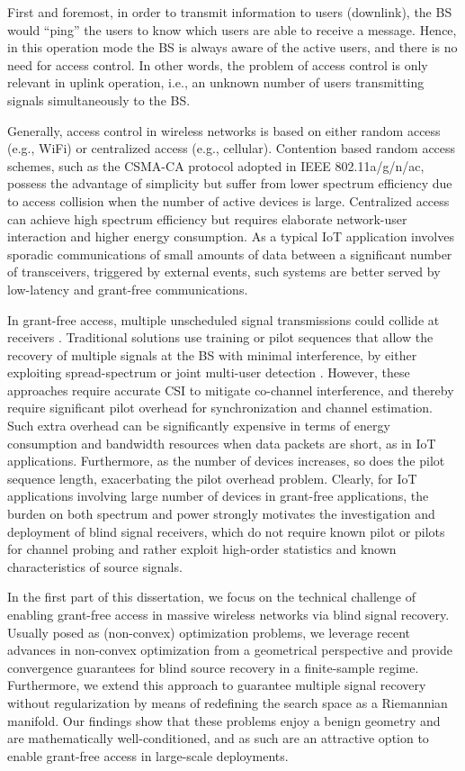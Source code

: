 First and foremost, in order to transmit information to users (downlink), the BS would ``ping'' the users to know which users are able to receive a message. Hence, in this operation mode the BS is always aware of the active users, and there is no need for access control. In other words, the problem of access control is only relevant in uplink operation, i.e., an unknown number of users transmitting signals simultaneously to the BS. 

Generally, access control in wireless networks is based on either random access (e.g., WiFi) or centralized access (e.g., cellular). 
Contention based random access schemes, such as the CSMA-CA protocol adopted in IEEE 802.11a/g/n/ac, possess the advantage of simplicity but suffer from lower spectrum efficiency due to access collision when the number of active devices is large.
Centralized access can achieve high spectrum efficiency but requires elaborate network-user interaction and higher energy consumption. 
As a typical IoT application involves sporadic communications of small amounts of data between a significant number of transceivers, triggered by external events, such systems are better served by low-latency and grant-free communications. 

In grant-free access, multiple unscheduled signal transmissions could collide at receivers \cite{Azari2017grantfreediversity}. Traditional solutions use training or pilot sequences that allow the recovery of multiple signals at the BS with minimal interference, by either exploiting spread-spectrum or joint multi-user detection \cite{Ciuonzo2015decisionfusion,Shirazinia2016decisionfusion}. However, these approaches require accurate CSI to mitigate co-channel interference, and thereby require significant pilot overhead for synchronization and channel estimation. Such extra overhead can be significantly expensive in terms of energy consumption and bandwidth resources when data packets are short, as in IoT applications. Furthermore, as the number of devices increases, so does the pilot sequence length, exacerbating the pilot overhead problem. 
Clearly, for IoT applications involving large number of devices in grant-free applications, the burden on both spectrum and power \cite{Masoudi2018grantfreescalability} strongly motivates the investigation and deployment of blind signal receivers, which do not require known pilot or pilots for channel probing and rather exploit high-order statistics and known characteristics of source signals.

In the first part of this dissertation, we focus on the technical challenge of enabling grant-free access in massive wireless networks via blind signal recovery. Usually posed as (non-convex) optimization problems, we leverage recent advances in non-convex optimization from a geometrical perspective and provide convergence guarantees for blind source recovery in a finite-sample regime. Furthermore, we extend this approach to guarantee multiple signal recovery without regularization by means of redefining the search space as a Riemannian manifold. Our findings show that these problems enjoy a benign geometry and are mathematically well-conditioned, and as such are an attractive option to enable grant-free access in large-scale deployments. 

